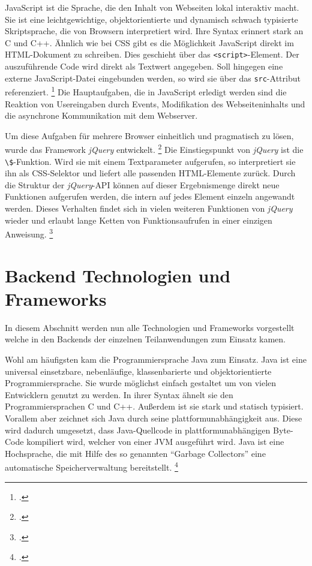 \label{par:javascript}
JavaScript ist die Sprache, die den Inhalt von Webseiten lokal interaktiv macht.
Sie ist eine leichtgewichtige, objektorientierte und dynamisch schwach typisierte Skriptsprache, die von Browsern interpretiert wird.
Ihre Syntax erinnert stark an C und C++.
Ähnlich wie bei \ac{CSS} gibt es die Möglichkeit JavaScript direkt im \ac{HTML}-Dokument zu schreiben.
Dies geschieht über das \lstinline[style=eclipse]{<script>}-Element.
Der auszuführende Code wird direkt als Textwert angegeben.
Soll hingegen eine externe JavaScript-Datei eingebunden werden, so wird sie über das \lstinline[style=eclipse]{src}-Attribut referenziert.
\footcite[Vgl.][198]{webTechnologies}
Die Hauptaufgaben, die in JavaScript erledigt werden sind die Reaktion von Usereingaben durch Events, Modifikation des Webseiteninhalts und die asynchrone Kommunikation mit dem Webserver.

Um diese Aufgaben für mehrere Browser einheitlich und pragmatisch zu lösen, wurde das Framework \textit{jQuery} entwickelt.
\footcite[Vgl.][]{jqueryHomepage}
Die Einstiegspunkt von \textit{jQuery} ist die \lstinline[style=eclipse]{\$}-Funktion.
Wird sie mit einem Textparameter aufgerufen, so interpretiert sie ihn als \ac{CSS}-Selektor und liefert alle passenden \ac{HTML}-Elemente zurück.
Durch die Struktur der \textit{jQuery}-\ac{API} können auf dieser Ergebnismenge direkt neue Funktionen aufgerufen werden, die intern auf jedes Element einzeln angewandt werden.
Dieses Verhalten findet sich in vielen weiteren Funktionen von \textit{jQuery} wieder und erlaubt lange Ketten von Funktionsaufrufen in einer einzigen Anweisung.
\footcite[Vgl.][3\pqs]{jqueryReference}



\section{Backend Technologien und Frameworks}

In diesem Abschnitt werden nun alle Technologien und Frameworks vorgestellt welche in den Backends der einzelnen Teilanwendungen zum Einsatz kamen.

\label{par:java}
Wohl am häufigsten kam die Programmiersprache Java zum Einsatz. Java ist eine universal einsetzbare, nebenläufige, klassenbarierte und objektorientierte Programmiersprache. Sie wurde möglichst einfach gestaltet um von vielen Entwicklern genutzt zu werden. In ihrer Syntax ähnelt sie den Programmiersprachen C und C++. Außerdem ist sie stark und statisch typisiert. Vorallem aber zeichnet sich Java durch seine plattformunabhängigkeit aus. Diese wird dadurch umgesetzt, dass Java-Quellcode in plattformunabhängigen Byte-Code kompiliert wird, welcher von einer \ac{JVM} ausgeführt wird. Java ist eine Hochsprache, die mit Hilfe des so genannten \enquote{Garbage Collectors} eine automatische Speicherverwaltung bereitstellt. \footcite[Vgl.][1]{javaspecification}

